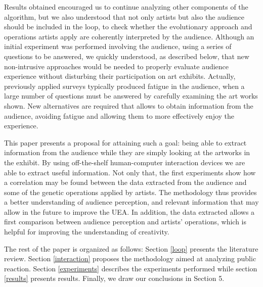 \documentclass[graybox]{svmult}
\begin{document}
Results obtained encouraged us to continue analyzing other components
of the algorithm, but we also understood that not only artists but
also the audience should be included in the loop, to check whether the
evolutionary approach and operations artists apply are coherently
interpreted by the audience.  Although an initial experiment was
performed involving the audience, using a series of questions to be
answered, we quickly understood, as described below, that new
non-intrusive approaches would be needed to properly evaluate audience
experience without disturbing their participation on art exhibits.
Actually, previously applied surveys typically produced fatigue in the
audience, when a large number of questions must be answered by
carefully examining the art works shown.  New alternatives are
required that allows to obtain information from the audience, avoiding
fatigue and allowing them to more effectively enjoy the experience. 

This paper presents a proposal for attaining such a goal:  being able
to extract information from the audience while they are simply looking
at the artworks in the exhibit.  By using off-the-shelf human-computer
interaction devices we are able to extract useful information. %
Not
only that, the first experiments show how a correlation may be found
between the data extracted from the audience and some of the genetic
operations applied by artists.  The methodology thus provides a better
understanding of audience perception, and relevant information that
may allow in the future to improve the UEA.  In addition, the data
extracted allows a first comparison between audience perception and
artists' operations, which is helpful for improving the understanding
of creativity. 

The rest of the paper is organized as follows: Section \ref{loop} presents the literature review. Section \ref{interaction} proposes the methodology aimed at analyzing public reaction. Section \ref{experiments} describes the experiments performed while section \ref{results} presents results.  Finally, we draw our conclusions in Section 5. %
\end{document}
